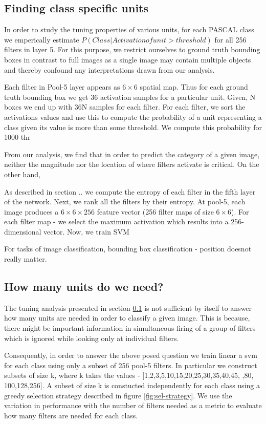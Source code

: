 \documentclass[runningheads]{llncs}
\begin{document}
\subsection{Finding class specific units}
\label{sub:class-specific-unit}
In order to study the tuning properties of various units, for each PASCAL class we emperically estimate $P(Class | Activation of unit > threshold)$ for all 256 filters in layer 5. For this purpose, we restrict ourselves to ground truth bounding boxes in contrast to full images as a single image may contain multiple objects and thereby confound any interpretations drawn from our analysis. 

Each filter in Pool-5 layer appears as $6 \times 6$ spatial map. Thus for each ground truth bounding box we get 36 activation samples for a particular unit. Given, N boxes we end up with 36N samples for each filter. For each filter, we sort the activations values and use this to compute the probability of a unit representing a class given its value is more than some threshold. We compute this probability for 1000 thr

From our analysis, we find that in order to predict the category of a given image, neither the magnitude nor the location of where filters activate is critical. On the other hand, 


As described in section .. we compute the entropy of each filter in the fifth layer of the network. Next, we rank all the filters by their entropy. At pool-5, each image produces a $6 \times 6 \times 256 $ feature vector (256 filter maps of size $6 \times 6$). For each filter map - we select the maximum activation which results into a 256-dimensional vector. Now, we train SVM 
 
For tasks of image classification, bounding box classification - position doesnot really matter. 

\subsection{How many units do we need?}
\label{sub:how-many}
The tuning analysis presented in section \ref{sub:class-specific-unit} is not sufficient by itself to answer how many units are needed in order to classify a given image. This is because, there might be important information in simultaneous firing of a group of filters which is ignored while looking only at individual filters. 

Consequently, in order to answer the above posed question we train linear a svm for each class using only a subset of 256 pool-5 filters. In particular we construct subsets of size k, where k takes the values - [1,2,3,5,10,15,20,25,30,35,40,45, ,80, 100,128,256]. A subset of size k is constucted independently for each class using a greedy selection strategy described in figure \ref{fig:sel-strategy}. We use the variation in performance with the number of filters needed as a metric to evaluate how many filters are needed for each class. 
  
\end{document}
